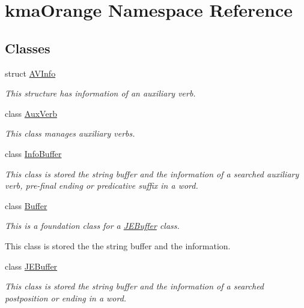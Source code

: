 \hypertarget{namespacekmaOrange}{
\section{kmaOrange Namespace Reference}
\label{namespacekmaOrange}
}
\subsection*{Classes}
\begin{CompactItemize}
\item 
struct \hyperlink{structkmaOrange_1_1AVInfo}{AVInfo}
\begin{CompactList}\small\item\em This structure has information of an auxiliary verb. \item\end{CompactList}\item 
class \hyperlink{classkmaOrange_1_1AuxVerb}{AuxVerb}
\begin{CompactList}\small\item\em This class manages auxiliary verbs. \item\end{CompactList}\item 
class \hyperlink{classkmaOrange_1_1InfoBuffer}{InfoBuffer}
\begin{CompactList}\small\item\em This class is stored the string buffer and the information of a searched auxiliary verb, pre-final ending or predicative suffix in a word. \item\end{CompactList}\item 
class \hyperlink{classkmaOrange_1_1Buffer}{Buffer}
\begin{CompactList}\small\item\em This is a foundation class for a \hyperlink{classkmaOrange_1_1JEBuffer}{JEBuffer} class.\par
 This class is stored the the string buffer and the information. \item\end{CompactList}\item 
class \hyperlink{classkmaOrange_1_1JEBuffer}{JEBuffer}
\begin{CompactList}\small\item\em This class is stored the string buffer and the information of a searched postposition or ending in a word. \item\end{CompactList}\item 

\end{CompactItemize}
